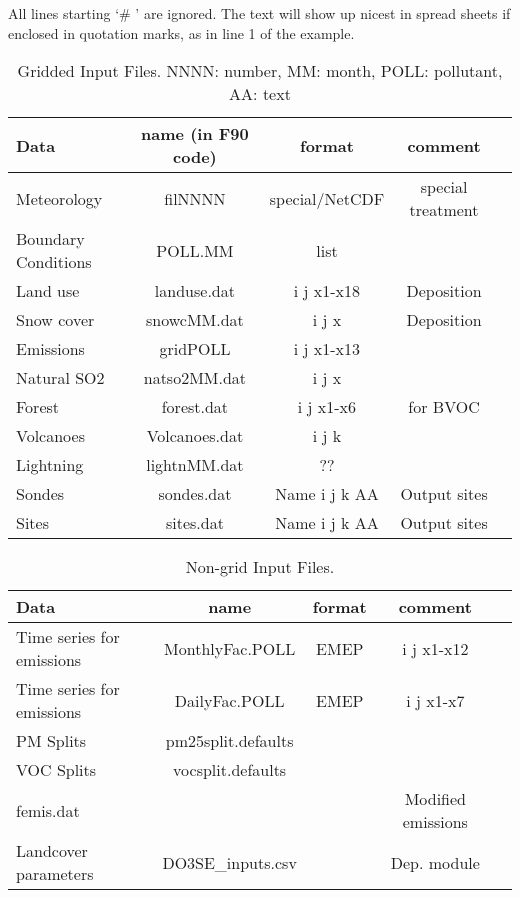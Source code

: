  All lines starting `\# ' are ignored. The text will show up nicest in
 spread sheets if enclosed in quotation marks, as in line 1 of the example.

\begin{table}[h]
\caption{Gridded Input Files. NNNN: number, MM: month, POLL: pollutant, AA: text}
\label{Tab:GridInputs}
\begin{tabular}{lcccc}\hline
Data & name (in F90 code) & format& comment\\ \hline
Meteorology&filNNNN&special/NetCDF& special treatment \\
Boundary Conditions&POLL.MM&list&\\
Land use&landuse.dat&i j x1-x18& Deposition \\ %
Snow cover&snowcMM.dat&i j x& Deposition\\
Emissions&gridPOLL&i j x1-x13&\\
Natural SO2&natso2MM.dat&i j x&\\
Forest&forest.dat&i j x1-x6&for BVOC \\ %
Volcanoes&Volcanoes.dat&i j k&   \\ %
Lightning&lightnMM.dat&??& \\
Sondes&sondes.dat& Name i j k AA& Output sites\\
Sites&sites.dat  & Name i j k AA& Output sites\\ \hline
\end{tabular}
\end{table}
 

\begin{table}[h]
\caption{Non-grid Input Files.}
\label{Tab:Inputs}
\begin{tabular}{lcccc}\hline
Data & name   &format& comment\\ \hline
Time series for emissions&MonthlyFac.POLL&EMEP&i j x1-x12&\\
Time series for emissions&DailyFac.POLL&EMEP&i j x1-x7&\\
PM Splits                   &pm25split.defaults&& \\
VOC Splits&vocsplit.defaults&& \\
femis.dat           &             & & Modified emissions \\
Landcover parameters& DO3SE\_inputs.csv && Dep. module \\
\hline
\end{tabular}
\end{table}

